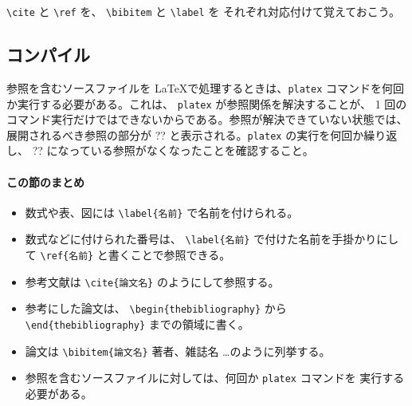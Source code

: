 \verb|\cite| と \verb|\ref| を、 \verb|\bibitem| と \verb|\label| を
それぞれ対応付けて覚えておこう。


\subsection{コンパイル}
\label{sec:latex:compile}

参照を含むソースファイルを \LaTeX で処理するときは、\texttt{platex} コマンドを何回か実行する必要がある。これは、 \texttt{platex} が参照関係を解決することが、 1 回のコマンド実行だけではできないからである。参照が解決できていない状態では、展開されるべき参照の部分が ?? と表示される。\texttt{platex} の実行を何回か繰り返し、 ?? になっている参照がなくなったことを確認すること。

\paragraph{この節のまとめ}

\begin{itemize}
\item 数式や表、図には \verb|\label{名前}| で名前を付けられる。
\item 数式などに付けられた番号は、 \verb|\label{名前}| で付けた名前を手掛かりにして \verb|\ref{名前}| と書くことで参照できる。
\item 参考文献は \verb|\cite{論文名}| のようにして参照する。
\item 参考にした論文は、 \verb|\begin{thebibliography}| から
    \verb|\end{thebibliography}| までの領域に書く。
\item 論文は \verb|\bibitem{論文名}| 著者、雑誌名 \dots のように列挙する。
\item 参照を含むソースファイルに対しては、何回か \texttt{platex} コマンドを
  実行する必要がある。
\end{itemize}
